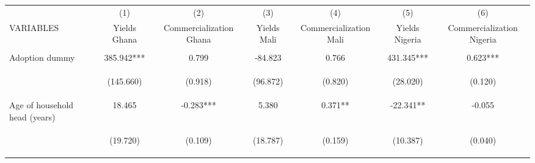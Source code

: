 \begin{center}
\begin{tabular}{lcccccc} \hline
 & (1) & (2) & (3) & (4) & (5) & (6) \\
VARIABLES & Yields Ghana & Commercialization Ghana & Yields Mali & Commercialization Mali & Yields Nigeria & Commercialization Nigeria \\ \hline
\vspace{4pt} & \begin{footnotesize}\end{footnotesize} & \begin{footnotesize}\end{footnotesize} & \begin{footnotesize}\end{footnotesize} & \begin{footnotesize}\end{footnotesize} & \begin{footnotesize}\end{footnotesize} & \begin{footnotesize}\end{footnotesize} \\
Adoption dummy & 385.942*** & 0.799 & -84.823 & 0.766 & 431.345*** & 0.623*** \\
\vspace{4pt} & \begin{footnotesize}(145.660)\end{footnotesize} & \begin{footnotesize}(0.918)\end{footnotesize} & \begin{footnotesize}(96.872)\end{footnotesize} & \begin{footnotesize}(0.820)\end{footnotesize} & \begin{footnotesize}(28.020)\end{footnotesize} & \begin{footnotesize}(0.120)\end{footnotesize} \\
Age of household head (years) & 18.465 & -0.283*** & 5.380 & 0.371** & -22.341** & -0.055 \\
\vspace{4pt} & \begin{footnotesize}(19.720)\end{footnotesize} & \begin{footnotesize}(0.109)\end{footnotesize} & \begin{footnotesize}(18.787)\end{footnotesize} & \begin{footnotesize}(0.159)\end{footnotesize} & \begin{footnotesize}(10.387)\end{footnotesize} & \begin{footnotesize}(0.040)\end{footnotesize} \\

\end{tabular}
\end{center}

